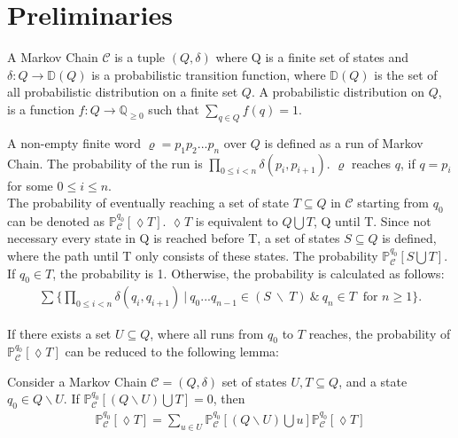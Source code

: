 \section{Preliminaries}
\label{sec:preliminaries}

\begin{definition}
\label{def:Markov Chains}
A Markov Chain $\mathcal{C}$ is a tuple $(Q, \delta)$ where Q is a finite set of states and 
$\delta: Q \rightarrow \mathbb{D}(Q)$ is a probabilistic transition function, where 
$\mathbb{D}(Q)$ is the set of all probabilistic distribution on a finite set $Q$. A probabilistic distribution on 
$Q$, is a function $f: Q\rightarrow\mathbb{Q}_{\geq0}$ such that $\sum_{q\in Q}f(q)=1$. 
\end{definition}

\noindent
A non-empty finite word $\varrho = p_1p_2...p_n$ over $Q$ is defined as a run of Markov Chain. 
The probability of the run is $\prod_{0\leq i < n}\delta(p_i,p_{i+1})$. 
$\varrho$ reaches $q$, if $q = p_i$ for some $0\leq i\leq n$. 
\newline
\\
The probability of eventually reaching a set of state $T\subseteq Q$ 
in $\mathcal{C}$ starting from $q_0$ can be denoted as $\mathbb{P}^{q_0}_\mathcal{C}[\lozenge T]$. $\lozenge T$ is 
equivalent to $Q\bigcup T$, Q until T. Since not necessary every state in Q is reached before T, 
a set of states $S\subseteq Q$ is defined, where the path until T only consists of these states.
The probability $\mathbb{P}^{q_0}_\mathcal{C}[S\bigcup T]$. If $q_0 \in T$, 
the probability is 1. Otherwise, the probability is calculated as follows: 
\begin{align*}
    \sum\biggl\{ \prod_{0\leq i< n}\delta(q_i,q_{i+1}) ~|~ q_0...q_{n-1}\in (S~\backslash~ T) ~\&~ q_n 
    \in T\ \text{ for } n\geq 1\biggr\}.
\end{align*}

\noindent
If there exists a set $U\subseteq Q$, where all runs from $q_0$ to $T$ reaches, the probability of 
$\mathbb{P}^{q_0}_\mathcal{C}[\lozenge T]$ can be reduced to the following lemma:  

\begin{lemma}
\label{lemma 1}
Consider a Markov Chain $\mathcal{C}=(Q,\delta)$ set of states $U,T\subseteq Q$, and a state $q_0\in Q\backslash U$. 
If $\mathbb{P}^{q_0}_\mathcal{C}[(Q\backslash U)\bigcup T]=0$, then 
\begin{align*}
    \mathbb{P}^{q_0}_\mathcal{C}[\lozenge T] = \sum_{u\in U}\mathbb{P}^{q_0}_\mathcal{C}[(Q\backslash U) \bigcup u]
    \mathbb{P}^{q_0}_\mathcal{C}[\lozenge T]
\end{align*}
\end{lemma}


